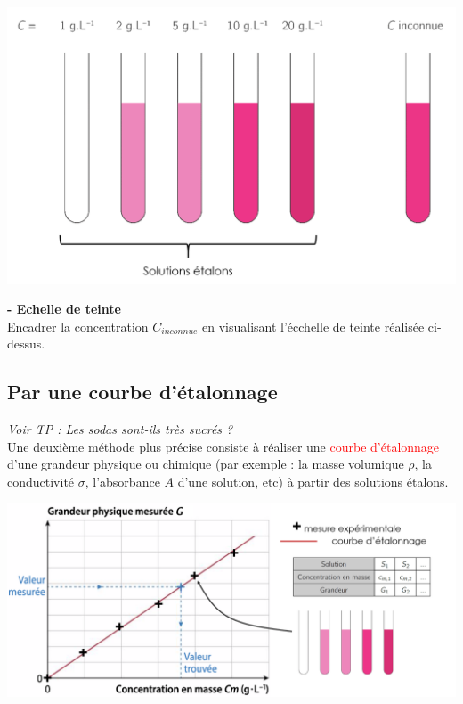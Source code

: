 \begin{center}
    \includegraphics[scale=0.45]{Images/Chapitre_2/Echelle_teinte.png}
\end{center}

\begin{mdframed}[style=autreexo]
\textbf{ - Echelle de teinte}\\
Encadrer la concentration $C_{inconnue}$ en visualisant l'écchelle de teinte réalisée ci-dessus.
\end{mdframed}


\subsection{Par une courbe d'étalonnage}
\begin{Large}
\end{Large}\textit{Voir TP : Les sodas sont-ils très sucrés ?}\\
Une deuxième méthode plus précise consiste à réaliser une \textcolor{red}{courbe d'étalonnage} d'une grandeur physique ou chimique (par exemple : la masse volumique $\rho$, la conductivité $\sigma$, l'absorbance $A$ d'une solution, etc) à partir des solutions étalons.

\begin{center}
    \includegraphics[scale=0.6]{Images/Chapitre_2/Courbe_etalonnage.png}
\end{center}

